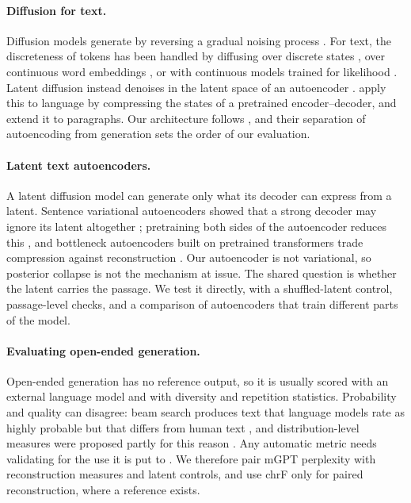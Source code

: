 \documentclass[11pt,a4paper]{article}
\begin{document}
\paragraph{Diffusion for text.}
Diffusion models generate by reversing a gradual noising process \citep{ho2020denoising,nichol2021improved}. For text, the discreteness of tokens has been handled by diffusing over discrete states \citep{austin2021structured}, over continuous word embeddings \citep{li2022diffusionlm,gong2023diffuseq} \citep{strudel2022self} \citep{dieleman2022continuous}, or with continuous models trained for likelihood \citep{gulrajani2023likelihood}. Latent diffusion instead denoises in the latent space of an autoencoder \citep{rombach2022high}. \citet{lovelace2023latent} apply this to language by compressing the states of a pretrained encoder--decoder, and \citet{zhang2023planner} extend it to paragraphs. Our architecture follows \citet{lovelace2023latent}, and their separation of autoencoding from generation sets the order of our evaluation.

\paragraph{Latent text autoencoders.}
A latent diffusion model can generate only what its decoder can express from a latent. Sentence variational autoencoders showed that a strong decoder may ignore its latent altogether \citep{bowman2016generating}; pretraining both sides of the autoencoder reduces this \citep{li2020optimus}, and bottleneck autoencoders built on pretrained transformers trade compression against reconstruction \citep{montero2021sentence}. Our autoencoder is not variational, so posterior collapse is not the mechanism at issue. The shared question is whether the latent carries the passage. We test it directly, with a shuffled-latent control, passage-level checks, and a comparison of autoencoders that train different parts of the model.

\paragraph{Evaluating open-ended generation.}
Open-ended generation has no reference output, so it is usually scored with an external language model and with diversity and repetition statistics. Probability and quality can disagree: beam search produces text that language models rate as highly probable but that differs from human text \citep{holtzman2020curious} \citep{meister2020beam}, and distribution-level measures were proposed partly for this reason \citep{pillutla2021mauve}. Any automatic metric needs validating for the use it is put to \citep{reiter2018structured}. We therefore pair mGPT perplexity \citep{shliazhko2024mgpt} with reconstruction measures and latent controls, and use chrF \citep{popovic2015chrf} only for paired reconstruction, where a reference exists.
\end{document}
